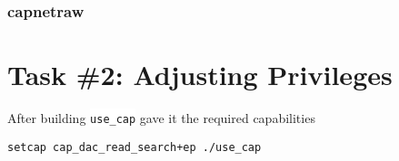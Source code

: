 \documentclass[11pt,letterpaper]{article}
\let\OldTexttt\texttt
\renewcommand{\texttt}[1]{\OldTexttt{\footnotesize\colorbox{background}{\textcolor{foreground}{#1}}}}
\begin{document}
{\subsubsection*{capnetraw}
\label{sec:org5c48e78}
\section*{Task \#2: Adjusting Privileges}
\label{sec:org9857b46}

After building \texttt{use\_cap} gave it the required capabilities
\lstset{language=sh,label= ,caption= ,captionpos=b,numbers=none}
\begin{lstlisting}
setcap cap_dac_read_search+ep ./use_cap
\end{lstlisting}


}%
\end{document}
